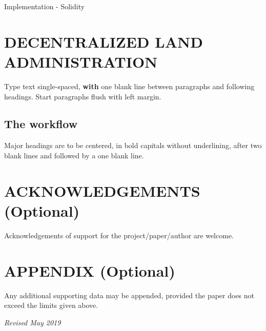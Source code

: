 \documentclass{isprs} %
\begin{document}
Implementation - Solidity 




\section{DECENTRALIZED LAND ADMINISTRATION}\label{sec:DECENTRALIZED LAND ADMINISTRATION}

Type text single-spaced, \textbf{with} one blank line between paragraphs and 
following headings. Start paragraphs flush with left margin.


\subsection{The workflow}\label{sec:The workflow}

Major headings are to be centered, in bold capitals without 
underlining, after two blank lines and followed by a one blank line.


\section*{ACKNOWLEDGEMENTS (Optional)}\label{ACKNOWLEDGEMENTS}
Acknowledgements of support for the project/paper/author are welcome. 

{
	\begin{spacing}{1.17}
		\normalsize
	\end{spacing}
}


\section*{APPENDIX (Optional)}\label{APPENDIX}

Any additional supporting data may be appended, provided the paper does not exceed the limits given above. 

\vspace{1cm}
\textit{Revised May 2019}
\end{document}
